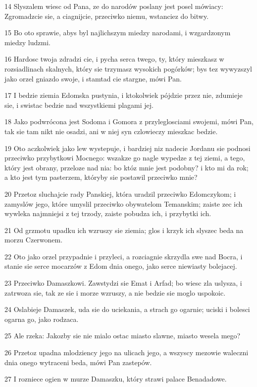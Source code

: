 \par 14 Slyszalem wiesc od Pana, ze do narodów poslany jest posel mówiacy: Zgromadzcie sie, a ciagnijcie, przeciwko niemu, wstanciez do bitwy.
\par 15 Bo oto sprawie, abys byl najlichszym miedzy narodami, i wzgardzonym miedzy ludzmi.
\par 16 Hardosc twoja zdradzi cie, i pycha serca twego, ty, który mieszkasz w rozsiadlinach skalnych, który sie trzymasz wysokich pogórków; bys tez wywyzszyl jako orzel gniazdo swoje, i stamtad cie stargne, mówi Pan.
\par 17 I bedzie ziemia Edomska pustynia, i ktokolwiek pójdzie przez nie, zdumieje sie, i swistac bedzie nad wszystkiemi plagami jej.
\par 18 Jako podwrócona jest Sodoma i Gomora z przyleglosciami swojemi, mówi Pan, tak sie tam nikt nie osadzi, ani w niej syn czlowieczy mieszkac bedzie.
\par 19 Oto aczkolwiek jako lew wystepuje, i bardziej niz nadecie Jordanu sie podnosi przeciwko przybytkowi Mocnego: wszakze go nagle wypedze z tej ziemi, a tego, który jest obrany, przeloze nad nia: bo któz mnie jest podobny? i kto mi da rok; a kto jest tym pasterzem, któryby sie postawil przeciwko mnie?
\par 20 Przetoz sluchajcie rady Panskiej, która uradzil przeciwko Edomczykom; i zamyslów jego, które umyslil przeciwko obywatelom Temanskim; zaiste zec ich wywleka najmniejsi z tej trzody, zaiste pobudza ich, i przybytki ich.
\par 21 Od grzmotu upadku ich wzruszy sie ziemia; glos i krzyk ich slyszec beda na morzu Czerwonem.
\par 22 Oto jako orzel przypadnie i przyleci, a rozciagnie skrzydla swe nad Bocra, i stanie sie serce mocarzów z Edom dnia onego, jako serce niewiasty bolejacej.
\par 23 Przeciwko Damaszkowi. Zawstydzi sie Emat i Arfad; bo wiesc zla uslysza, i zatrwoza sie, tak ze sie i morze wzruszy, a nie bedzie sie moglo uspokoic.
\par 24 Oslabieje Damaszek, uda sie do uciekania, a strach go ogarnie; uciski i bolesci ogarna go, jako rodzaca.
\par 25 Ale rzeka: Jakozby sie nie mialo ostac miasto slawne, miasto wesela mego?
\par 26 Przetoz upadna mlodziency jego na ulicach jego, a wszyscy mezowie waleczni dnia onego wytraceni beda, mówi Pan zastepów.
\par 27 I rozniece ogien w murze Damaszku, który strawi palace Benadadowe.
